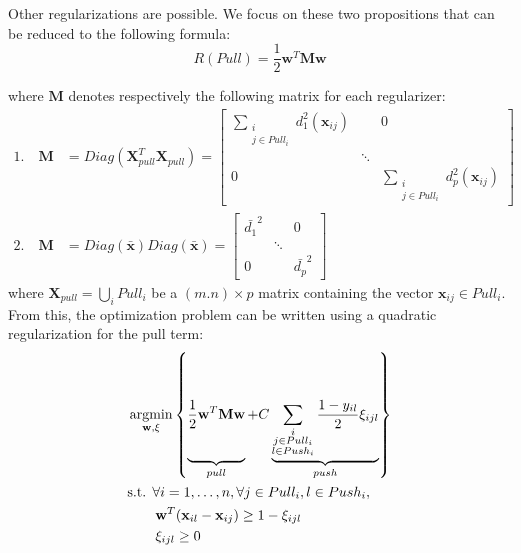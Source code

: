 \noindent Other regularizations are possible. We focus on these two propositions that can be reduced to the following formula:
\begin{equation}
R(Pull) = \frac{1}{2} \textbf{w}^T \textbf{M} \textbf{w}
\end{equation}

\noindent where $\textbf{M}$ denotes respectively the following matrix for each regularizer:
\begin{align}
	1. \quad \textbf{M} &= Diag(\textbf{X}_{pull}^T\textbf{X}_{pull}) = 
	\begin{bmatrix} 
		\sum\limits_{\substack{i \\ j \in Pull_i}} d_1^2(\textbf{x}_{ij}) 		&  	& 0 \\ 
		& \ddots 	&  \\ 
		0 		&  	& \sum\limits_{\substack{i \\ j \in Pull_i}} d_p^2(\textbf{x}_{ij})
	\end{bmatrix} \label{eq:M_1} \\
	2. \quad \textbf{M} &= Diag(\bar{\textbf{x}}) Diag(\bar{\textbf{x}}) =
	\begin{bmatrix} 
		\bar{d_1}^2 &  	& 0 \\ 
		& \ddots 	&  \\ 
		0 		&  	& \bar{d_p}^2
	\end{bmatrix} \label{eq:M_2}
\end{align}
where $\textbf{X}_{pull} = \bigcup_i Pull_i $ be a $(m.n) \times p$ matrix containing the vector $\textbf{x}_{ij} \in Pull_i$. \\

\noindent From this, the optimization problem can be written using a quadratic regularization for the pull term:
\begin{equation}
	\begin{aligned}
	&\displaystyle 		\argmin_{\textbf{w},\xi}
	\left\lbrace \underbrace{
		\vphantom{ \sum\limits_{\substack{i \\ j \in Pull_i \\ l \in Push_i}} }
		\frac{1}{2} \textbf{w}^T \textbf{M} \textbf{w}		
	}_{pull}				
	+					
	C
	\underbrace{
	\sum\limits_{\substack{i \\ j \in Pull_i \\ l \in Push_i}} \frac{1-y_{il}}{2} \xi_{ijl}
	}_{push}
	\right\rbrace  \\
	&\text{s.t.  } \forall i = 1, \ldots, n, \forall j \in Pull_i, l \in Push_i, \\
	& \qquad \textbf{w}^T(\textbf{x}_{il}-\textbf{x}_{ij}) \geq 1-\xi_{ijl} \\
	& \qquad \xi_{ijl} \geq 0 
	\end{aligned}
	\label{eq:quadratic}
\end{equation}

